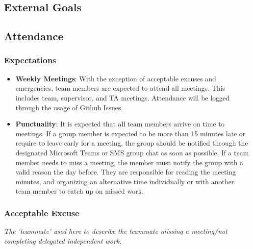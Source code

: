 \documentclass{article}
\begin{document}

\subsection*{External Goals}


\subsection*{Attendance}

\subsubsection*{Expectations}

\begin{itemize}
  \item \textbf{Weekly Meetings}: With the exception of acceptable excuses and emergencies, team members are expected to attend all meetings. This includes team, supervisor, and TA meetings. Attendance will be logged through the usage of Github Issues. 
  \item \textbf{Punctuality}: It is expected that all team members arrive on time to meetings. If a group member is expected to be more than 15 minutes late or require to leave early for a meeting, the group should be notified through the designated Microsoft Teams or SMS group chat as soon as possible. If a team member needs to miss a meeting, the member must notify the group with a valid reason the day before. They are responsible for reading the meeting minutes, and organizing an alternative time individually or with another team member to catch up on missed work.
\end{itemize}

\subsubsection*{Acceptable Excuse}

\textit{The ‘teammate’ used here to describe the teammate missing a meeting/not completing delegated independent work.} \\
\end{document}
